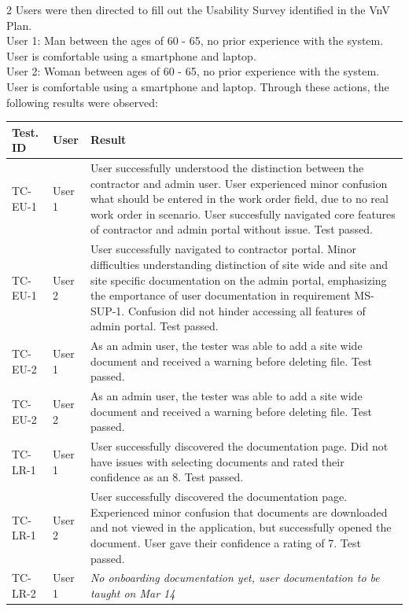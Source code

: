 \documentclass[12pt, titlepage]{article}
\begin{document}
2 Users were then directed to fill out the Usability Survey
identified in the VnV Plan.\\
User 1: Man between the ages of 60 - 65, no prior experience with the
system. User is comfortable using a smartphone and laptop.\\
User 2: Woman between ages of 60 - 65, no prior experience with the
system. User is comfortable using a smartphone and laptop.
Through these actions, the following results were observed:\\
\begin{longtable}{|m{2cm}|m{1.5cm}|m{9cm}|}
  \hline
  \textbf{Test. ID}  & \textbf{User} & \textbf{Result} \\
  \hline
  TC-EU-1 & User 1& User successfully understood the distinction
  between the contractor and admin user. User experienced minor
  confusion what should be entered in the work order field, due to no
  real work order in scenario. User succesfully navigated core
  features of contractor
  and admin portal without issue. Test passed.\\
  \hline
  TC-EU-1 & User 2& User successfully navigated to contractor portal.
  Minor difficulties understanding distinction of site wide and
  site and site specific documentation on the admin portal,
  emphasizing the emportance of user documentation in requirement MS-SUP-1.
  Confusion did not hinder accessing all features of admin portal.
  Test passed.\\
  \hline
  TC-EU-2 & User 1& As an admin user, the tester was able to add a
  site wide document and received a warning before deleting file. Test passed.\\
  \hline
  TC-EU-2 & User 2& As an admin user, the tester was able to add a
  site wide document and received a warning before deleting file. Test passed.\\
  \hline
  TC-LR-1 & User 1& User successfully discovered the documentation
  page. Did not have issues with selecting documents and
  rated their confidence as an 8. Test passed. \\
  \hline
  TC-LR-1& User 2& User successfully discovered the documentation
  page. Experienced minor confusion that documents are downloaded
  and not viewed in the application, but successfully opened the
  document. User gave their confidence a rating of 7. Test passed.\\
  \hline
  TC-LR-2 & User 1 & \textit{No onboarding documentation yet, user
  documentation to be taught on Mar 14} \\

\end{longtable}
\end{document}

